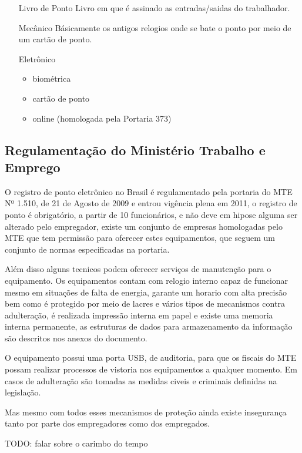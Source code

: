 \documentclass[12pt,openright,twoside,a4paper,english, brazil]{abntex2} %
\begin{document}
\begin{itemize}
 \item [Livro de Ponto] Livro em que é assinado as entradas/saidas do trabalhador.
 \item [Mecânico] Básicamente os antigos relogios onde se bate o ponto por meio de um cartão de ponto.
 \item [Eletrônico] \begin{itemize} 
 										 \item biométrica
 										 \item cartão de ponto
 										 \item online (homologada pela Portaria 373)
                    \end{itemize}
\end{itemize}

\subsection{Regulamentação do Ministério Trabalho e Emprego}

O registro de ponto eletrônico no Brasil é regulamentado pela portaria do \gls{MTE} Nº 1.510, de 21 de Agosto de 2009 e entrou vigência plena em 2011, o registro de ponto é obrigatório, a partir de 10 funcionários, e não deve em hipose alguma ser alterado pelo empregador, existe um conjunto de empresas homologadas pelo \gls{MTE} que tem permissão para oferecer estes equipamentos, que seguem um conjunto de normas especificadas na portaria.

Além disso alguns tecnicos podem oferecer serviços de manutenção para o equipamento. Os equipamentos contam com relogio interno capaz de funcionar mesmo em situações de falta de energia, garante um horario com alta precisão bem como é protegido por meio de lacres e vários tipos de mecanismos contra adulteração, é realizada impressão interna em papel e existe uma memoria interna permanente, as estruturas de dados para armazenamento da informação são descritos nos anexos do documento.

O equipamento possui uma porta \gls{USB}, de auditoria, para que os fiscais do \gls{MTE} possam realizar processos de vistoria nos equipamentos a qualquer momento. Em casos de adulteração são tomadas as medidas civeis e criminais definidas na legislação. 

Mas mesmo com todos esses mecanismos de proteção ainda existe insegurança tanto por parte dos empregadores como dos empregados.

TODO: falar sobre o carimbo do tempo
\end{document}
